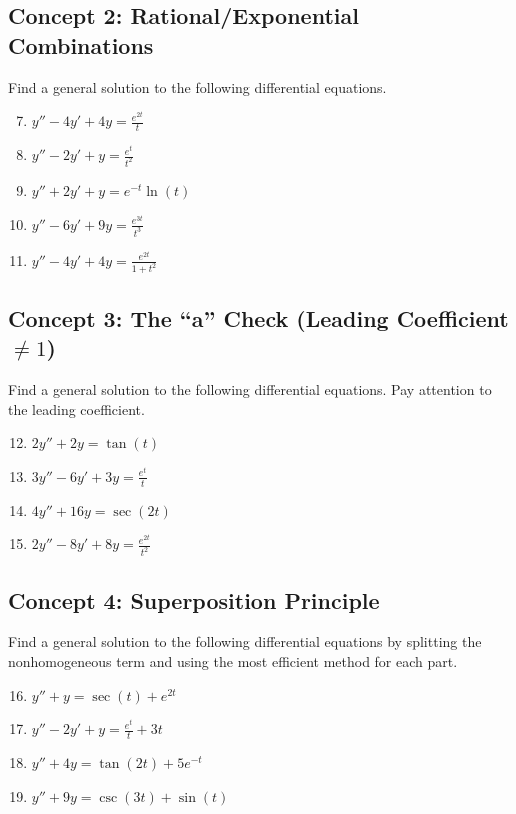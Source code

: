 \documentclass[11pt]{article}
\begin{document}
\subsection*{Concept 2: Rational/Exponential Combinations}
Find a general solution to the following differential equations.
\begin{enumerate}
    \setcounter{enumi}{6}
    \item $y'' - 4y' + 4y = \frac{e^{2t}}{t}$
    \item $y'' - 2y' + y = \frac{e^t}{t^2}$
    \item $y'' + 2y' + y = e^{-t}\ln(t)$
    \item $y'' - 6y' + 9y = \frac{e^{3t}}{t^3}$
    \item $y'' - 4y' + 4y = \frac{e^{2t}}{1+t^2}$
\end{enumerate}

\subsection*{Concept 3: The ``a'' Check (Leading Coefficient $\neq 1$)}
Find a general solution to the following differential equations. Pay attention to the leading coefficient.
\begin{enumerate}
    \setcounter{enumi}{11}
    \item $2y'' + 2y = \tan(t)$
    \item $3y'' - 6y' + 3y = \frac{e^t}{t}$
    \item $4y'' + 16y = \sec(2t)$
    \item $2y'' - 8y' + 8y = \frac{e^{2t}}{t^2}$
\end{enumerate}

\subsection*{Concept 4: Superposition Principle}
Find a general solution to the following differential equations by splitting the nonhomogeneous term and using the most efficient method for each part.
\begin{enumerate}
    \setcounter{enumi}{15}
    \item $y'' + y = \sec(t) + e^{2t}$
    \item $y'' - 2y' + y = \frac{e^t}{t} + 3t$
    \item $y'' + 4y = \tan(2t) + 5e^{-t}$
    \item $y'' + 9y = \csc(3t) + \sin(t)$
\end{enumerate}
\end{document}
